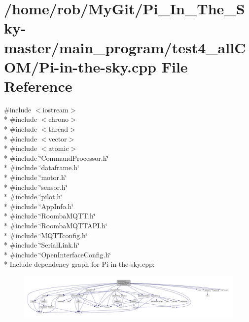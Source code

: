 \hypertarget{test4__all_c_o_m_2_pi-in-the-sky_8cpp}{}\section{/home/rob/\+My\+Git/\+Pi\+\_\+\+In\+\_\+\+The\+\_\+\+Sky-\/master/main\+\_\+program/test4\+\_\+all\+C\+O\+M/\+Pi-\/in-\/the-\/sky.cpp File Reference}
\label{test4__all_c_o_m_2_pi-in-the-sky_8cpp}
{\ttfamily \#include $<$iostream$>$}\\*
{\ttfamily \#include $<$chrono$>$}\\*
{\ttfamily \#include $<$thread$>$}\\*
{\ttfamily \#include $<$vector$>$}\\*
{\ttfamily \#include $<$atomic$>$}\\*
{\ttfamily \#include \char`\"{}Command\+Processor.\+h\char`\"{}}\\*
{\ttfamily \#include \char`\"{}dataframe.\+h\char`\"{}}\\*
{\ttfamily \#include \char`\"{}motor.\+h\char`\"{}}\\*
{\ttfamily \#include \char`\"{}sensor.\+h\char`\"{}}\\*
{\ttfamily \#include \char`\"{}pilot.\+h\char`\"{}}\\*
{\ttfamily \#include \char`\"{}App\+Info.\+h\char`\"{}}\\*
{\ttfamily \#include \char`\"{}Roomba\+M\+Q\+T\+T.\+h\char`\"{}}\\*
{\ttfamily \#include \char`\"{}Roomba\+M\+Q\+T\+T\+A\+P\+I.\+h\char`\"{}}\\*
{\ttfamily \#include \char`\"{}M\+Q\+T\+Tconfig.\+h\char`\"{}}\\*
{\ttfamily \#include \char`\"{}Serial\+Link.\+h\char`\"{}}\\*
{\ttfamily \#include \char`\"{}Open\+Interface\+Config.\+h\char`\"{}}\\*
Include dependency graph for Pi-\/in-\/the-\/sky.cpp\+:\nopagebreak
\begin{figure}[H]
\begin{center}
\leavevmode
\includegraphics[width=350pt]{test4__all_c_o_m_2_pi-in-the-sky_8cpp__incl}
\end{center}
\end{figure}
